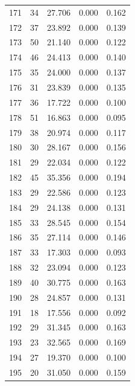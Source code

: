 \begin{table}
\begin{tabular}{rrrrr}
 171 &     34 &         27.706 &        0.000 &           0.162 \\
 172 &     37 &         23.892 &        0.000 &           0.139 \\
 173 &     50 &         21.140 &        0.000 &           0.122 \\
 174 &     46 &         24.413 &        0.000 &           0.140 \\
 175 &     35 &         24.000 &        0.000 &           0.137 \\
 176 &     31 &         23.839 &        0.000 &           0.135 \\
 177 &     36 &         17.722 &        0.000 &           0.100 \\
 178 &     51 &         16.863 &        0.000 &           0.095 \\
 179 &     38 &         20.974 &        0.000 &           0.117 \\
 180 &     30 &         28.167 &        0.000 &           0.156 \\
 181 &     29 &         22.034 &        0.000 &           0.122 \\
 182 &     45 &         35.356 &        0.000 &           0.194 \\
 183 &     29 &         22.586 &        0.000 &           0.123 \\
 184 &     29 &         24.138 &        0.000 &           0.131 \\
 185 &     33 &         28.545 &        0.000 &           0.154 \\
 186 &     35 &         27.114 &        0.000 &           0.146 \\
 187 &     33 &         17.303 &        0.000 &           0.093 \\
 188 &     32 &         23.094 &        0.000 &           0.123 \\
 189 &     40 &         30.775 &        0.000 &           0.163 \\
 190 &     28 &         24.857 &        0.000 &           0.131 \\
 191 &     18 &         17.556 &        0.000 &           0.092 \\
 192 &     29 &         31.345 &        0.000 &           0.163 \\
 193 &     23 &         32.565 &        0.000 &           0.169 \\
 194 &     27 &         19.370 &        0.000 &           0.100 \\
 195 &     20 &         31.050 &        0.000 &           0.159 \\

\end{tabular}
\end{table}
